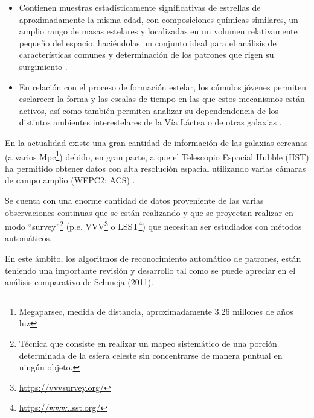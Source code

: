 \documentclass[
	11pt,oneside,a4paper
]{article}
\begin{document}
\begin{itemize}
	\item Contienen muestras estadísticamente significativas de estrellas de aproximadamente la misma edad, con composiciones químicas similares, un amplio rango de masas estelares y localizadas en un volumen relativamente pequeño del espacio, haciéndolas un conjunto ideal para el análisis de características comunes y determinación de los patrones que rigen su surgimiento \parencite{Klessen2000}.
	\item En relación con el proceso de formación estelar, los cúmulos jóvenes permiten esclarecer la forma y las escalas de tiempo en las que estos mecanismos están activos, así como también permiten analizar su dependendencia de los distintos ambientes interestelares de la Vía Láctea o de otras galaxias \parencite{Fall2012}.
\end{itemize}


En la actualidad existe una gran cantidad de información de las galaxias cercanas (a varios Mpc\footnote{Megaparsec, medida de distancia, aproximadamente 3.26 millones de años luz}) debido, en gran parte, a que el Telescopio Espacial Hubble (HST) ha permitido obtener datos con alta resolución espacial utilizando varias cámaras de campo amplio (WFPC2; ACS) \parencite{Dalcanton2009}.

Se cuenta con una enorme cantidad de datos proveniente de las varias observaciones continuas que se están realizando y que se proyectan realizar en modo “survey”\footnote{Técnica que consiste en realizar un mapeo sistemático de una porción determinada de la esfera celeste sin concentrarse de manera puntual en ningún objeto.} (p.e. VVV\footnote{\url{https://vvvsurvey.org/}} o LSST\footnote{\url{https://www.lsst.org/}}) que necesitan ser estudiados con métodos automáticos. 

En este ámbito, los algoritmos de reconocimiento automático de patrones, están teniendo una importante revisión y desarrollo tal como se puede apreciar en el análisis comparativo de Schmeja (2011)\parencite{Schmeja2011}.

\end{document}
